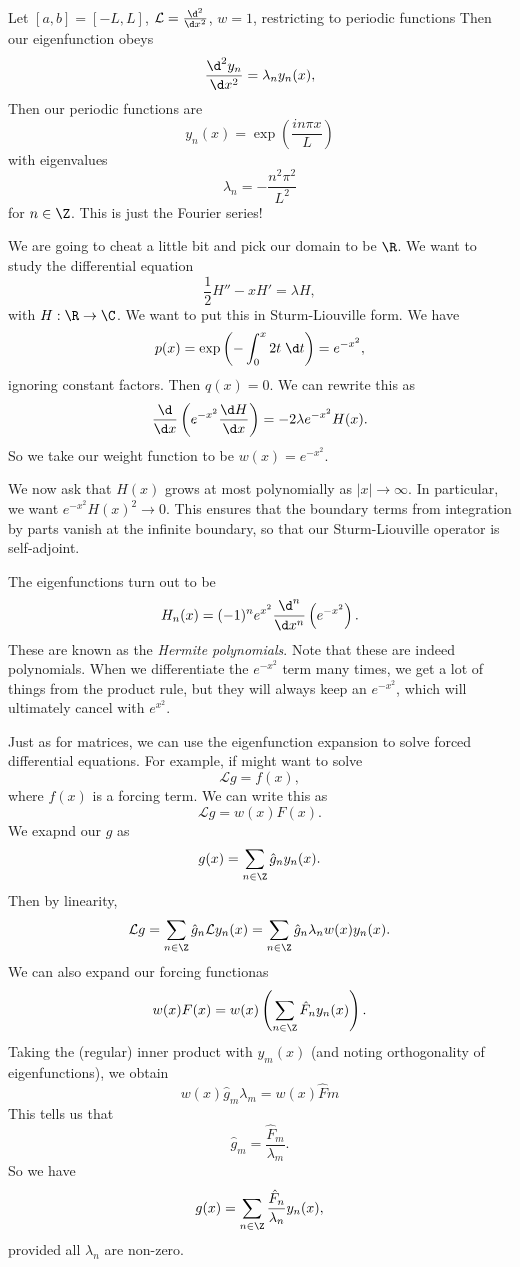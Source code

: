 \documentclass[a4paper]{article}
\begin{document}
\begin{eg}
  Let $[a, b] = [-L, L]$, $\mathcal{L} = \frac{\d^2}{\d x^2}$, $w = 1$, restricting to periodic functions Then our eigenfunction obeys
  \[
    \frac{\d^2 y_n}{\d x^2} = \lambda_n y_n(x),
  \]
  Then our periodic functions are
  \[
    y_n(x) = \exp\left(\frac{in\pi x}{L}\right)
  \]
  with eigenvalues
  \[
    \lambda_n = - \frac{n^2 \pi^2}{L^2}
  \]
  for $n \in \Z$. This is just the Fourier series!
\end{eg}

\begin{eg}
  We are going to cheat a little bit and pick our domain to be $\R$. We want to study the differential equation
  \[
    \frac{1}{2}H'' - xH' = \lambda H,
  \]
  with $H: \R \to \C$. We want to put this in Sturm-Liouville form. We have
  \[
    p(x) = \exp\left(-\int_0^x 2t \;\d t\right) = e^{-x^2},
  \]
  ignoring constant factors. Then $q(x) = 0$. We can rewrite this as
  \[
    \frac{\d}{\d x}\left(e^{-x^2}\frac{\d H}{\d x}\right) = -2\lambda e^{-x^2} H(x).
  \]
  So we take our weight function to be $w(x) = e^{-x^2}$.

  We now ask that $H(x)$ grows at most polynomially as $|x| \to \infty$. In particular, we want $e^{-x^2}H(x)^2 \to 0$. This ensures that the boundary terms from integration by parts vanish at the infinite boundary, so that our Sturm-Liouville operator is self-adjoint.

  The eigenfunctions turn out to be
  \[
    H_n(x) = (-1)^n e^{x^2}\frac{\d^n}{\d x^n}\left(e^{-x^2}\right).
  \]
  These are known as the \emph{Hermite polynomials}. Note that these are indeed polynomials. When we differentiate the $e^{-x^2}$ term many times, we get a lot of things from the product rule, but they will always keep an $e^{-x^2}$, which will ultimately cancel with $e^{x^2}$.
\end{eg}

Just as for matrices, we can use the eigenfunction expansion to solve forced differential equations. For example, if might want to solve
\[
  \mathcal{L} g = f(x),
\]
where $f(x)$ is a forcing term. We can write this as
\[
  \mathcal{L} g = w(x) F(x).
\]
We exapnd our $g$ as
\[
  g(x) = \sum_{n \in \Z}\hat{g}_n y_n(x).
\]
Then by linearity,
\[
  \mathcal{L}g = \sum_{n \in \Z}\hat{g}_n \mathcal{L} y_n(x) = \sum_{n \in \Z}\hat{g}_n \lambda_n w(x)y_n(x).
\]
We can also expand our forcing functionas
\[
  w(x) F(x) = w(x) \left(\sum_{n \in \Z}\hat{F}_n y_n(x)\right).
\]
Taking the (regular) inner product with $y_m(x)$ (and noting orthogonality of eigenfunctions), we obtain
\[
  w(x) \hat{g}_m \lambda_m = w(x) \hat{F}m
\]
This tells us that
\[
  \hat{g}_m = \frac{\hat{F}_m}{\lambda_m}.
\]
So we have
\[
  g(x) = \sum_{n \in \Z}\frac{\hat{F}_n}{\lambda_n}y_n(x),
\]
provided all $\lambda_n$ are non-zero.
\end{document}
